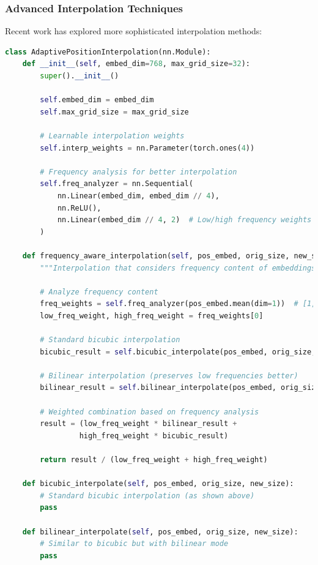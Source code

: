 \subsubsection{Advanced Interpolation Techniques}

Recent work has explored more sophisticated interpolation methods:

\begin{lstlisting}[language=Python, caption=Advanced position embedding interpolation]
class AdaptivePositionInterpolation(nn.Module):
    def __init__(self, embed_dim=768, max_grid_size=32):
        super().__init__()
        
        self.embed_dim = embed_dim
        self.max_grid_size = max_grid_size
        
        # Learnable interpolation weights
        self.interp_weights = nn.Parameter(torch.ones(4))
        
        # Frequency analysis for better interpolation
        self.freq_analyzer = nn.Sequential(
            nn.Linear(embed_dim, embed_dim // 4),
            nn.ReLU(),
            nn.Linear(embed_dim // 4, 2)  # Low/high frequency weights
        )
    
    def frequency_aware_interpolation(self, pos_embed, orig_size, new_size):
        """Interpolation that considers frequency content of embeddings"""
        
        # Analyze frequency content
        freq_weights = self.freq_analyzer(pos_embed.mean(dim=1))  # [1, 2]
        low_freq_weight, high_freq_weight = freq_weights[0]
        
        # Standard bicubic interpolation
        bicubic_result = self.bicubic_interpolate(pos_embed, orig_size, new_size);
        
        # Bilinear interpolation (preserves low frequencies better)
        bilinear_result = self.bilinear_interpolate(pos_embed, orig_size, new_size);
        
        # Weighted combination based on frequency analysis
        result = (low_freq_weight * bilinear_result + 
                 high_freq_weight * bicubic_result)
        
        return result / (low_freq_weight + high_freq_weight)
    
    def bicubic_interpolate(self, pos_embed, orig_size, new_size):
        # Standard bicubic interpolation (as shown above)
        pass
    
    def bilinear_interpolate(self, pos_embed, orig_size, new_size):
        # Similar to bicubic but with bilinear mode
        pass
\end{lstlisting}

